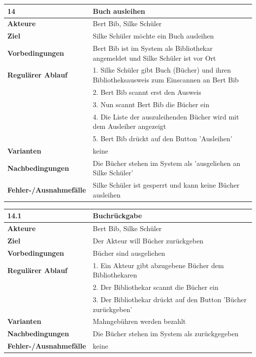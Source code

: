 \documentclass[fontsize=12pt,paper=a4,twoside]{scrartcl}
\begin{document}
\newpage
\begin{table}[htbp]
\label{14}
\begin{tabular}{|l|p{10cm}|}
\hline 
\textbf{14} & \textbf{Buch ausleihen} \\ \hline
\textbf{Akteure} & Bert Bib, Silke Schüler\\ \hline
\textbf{Ziel} & Silke Schüler möchte ein Buch ausleihen \\ \hline
\textbf{Vorbedingungen} & Bert Bib ist im System als Bibliothekar angemeldet und Silke Schüler ist vor 
Ort \\ \hline
\textbf{Regulärer Ablauf} & 
1. Silke Schüler gibt Buch (Bücher) und ihren Bibliotheksausweis zum Einscannen an Bert Bib\\
&2. Bert Bib scannt erst den Ausweis\\
&3. Nun scannt Bert Bib die Bücher ein\\
&4. Die Liste der auszuleihenden Bücher wird mit dem Ausleiher angezeigt\\
&5. Bert Bib drückt auf den Button 'Ausleihen'\\
\hline
\textbf{Varianten} & 
keine \\ \hline
\textbf{Nachbedingungen} & Die Bücher stehen im System als 'ausgeliehen an Silke Schüler'\\ \hline
\textbf{Fehler-/Ausnahmefälle} & Silke Schüler ist gesperrt und kann keine Bücher ausleihen\\
\hline
\end{tabular}
\end{table}

\newpage
\begin{table}[htbp]
\label{14.1}
\begin{tabular}{|l|p{10cm}|}
\hline 
\textbf{14.1} & \textbf{Buchrückgabe} \\ \hline
\textbf{Akteure} & Bert Bib, Silke Schüler\\ \hline
\textbf{Ziel} & Der Akteur will Bücher zurückgeben \\ \hline
\textbf{Vorbedingungen} & Bücher sind ausgeliehen \\ \hline
\textbf{Regulärer Ablauf} & 
1. Ein Akteur gibt abzugebene Bücher dem Bibliothekaren \\
&2. Der Bibliothekar scannt die Bücher ein\\
&3. Der Bibliothekar drückt auf den Button 'Bücher zurückgeben'\\
\hline
\textbf{Varianten} & 
Mahngebühren werden bezahlt \\ \hline
\textbf{Nachbedingungen} & Die Bücher stehen im System als zurückgegeben\\ \hline
\textbf{Fehler-/Ausnahmefälle} & keine\\
\hline
\end{tabular}
\end{table}
\end{document}
